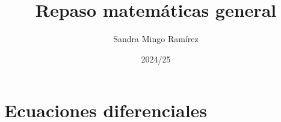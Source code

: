\documentclass[nochap]{config/ejercicios}
\title{Repaso matemáticas general}
\author{Sandra Mingo Ramírez}
\date{2024/25}
\begin{document}
\maketitle

\tableofcontents

\newpage 



\section{Ecuaciones diferenciales}
\end{document}
